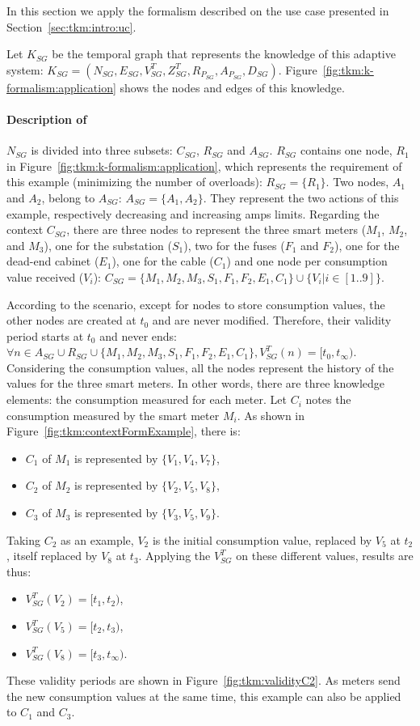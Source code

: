 In this section we apply the formalism described on the use case presented in Section~\ref{sec:tkm:intro:uc}.

Let $K_{SG}$ be the temporal graph that represents the knowledge of this adaptive system: $K_{SG} = (N_{SG}, E_{SG}, V^T_{SG}, Z^T_{SG}, R_{P_{SG}}, A_{P_{SG}}, D_{SG})$.
Figure~\ref{fig:tkm:k-formalism:application} shows the nodes and edges of this knowledge.

\paragraph{Description of }
$N_{SG}$ is divided into three subsets: $C_{SG}$, $R_{SG}$ and $A_{SG}$.
$R_{SG}$ contains one node, $R_1$ in Figure~\ref{fig:tkm:k-formalism:application}, which represents the requirement of this example (minimizing the number of overloads): $R_{SG} = \{R_1\}$.
Two nodes, $A_1$ and $A_2$, belong to $A_{SG}$: $A_{SG} = \{ A_1, A_2\}$.
They represent the two actions of this example, respectively decreasing and increasing amps limits.
Regarding the context $C_{SG}$, there are three nodes to represent the three smart meters ($M_1$, $M_2$, and $M_3$), one for the substation ($S_1$), two for the fuses ($F_1$ and $F_2$), one for the dead-end cabinet ($E_1$), one for the cable ($C_1$) and one node per consumption value received ($V_i$): $C_{SG} = \{M_1, M_2, M_3, S_1, F_1, F_2, E_1, C_1 \} \cup \{ V_i | i \in [1..9]\}$.

According to the scenario, except for nodes to store consumption values, the other nodes are created at $t_0$ and are never modified.
Therefore, their validity period starts at $t_0$ and never ends: $\forall n \in A_{SG} \cup R_{SG} \cup \{M_1, M_2, M_3, S_1, F_1, F_2, E_1, C_1\}, V^T_{SG}(n) = [t_0, t_\infty)$.
Considering the consumption values, all the nodes represent the history of the values for the three smart meters.
In other words, there are three knowledge elements: the consumption measured for each meter.
Let $C_i$ notes the consumption measured by the smart meter $M_i$.
As shown in Figure~\ref{fig:tkm:contextFormExample}, there is:
\begin{itemize}
	\item $C_1$ of $M_1$ is represented by $\{V_1, V_4, V_7\}$,
	\item $C_2$ of $M_2$ is represented by $\{V_2, V_5, V_8\}$,
	\item $C_3$ of $M_3$ is represented by $\{V_3, V_5, V_9\}$.
\end{itemize}
Taking $C_2$ as an example, $V_2$ is the initial consumption value, replaced by $V_5$ at $t_2$, itself replaced by $V_8$ at $t_3$. 
Applying the $V_{SG}^T$ on these different values, results are thus:
\begin{itemize}
	\item $V_{SG}^T(V_2) = [t_1, t_2)$,
	\item $V_{SG}^T(V_5) = [t_2, t_3)$,
	\item $V_{SG}^T(V_8) = [t_3, t_\infty)$.
\end{itemize}
These validity periods are shown in Figure~\ref{fig:tkm:validityC2}.
As meters send the new consumption values at the same time, this example can also be applied to $C_1$ and $C_3$.

